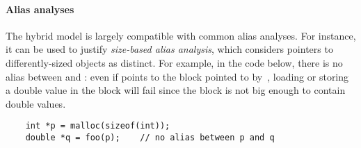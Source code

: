 


\paragraph{Alias analyses} The hybrid model is largely
compatible with common alias analyses.  For instance, it can be used
to justify \textit{size-based alias analysis}, which considers
pointers to differently-sized objects as distinct. For example, in
the code below, there is no alias between  and :
even if  points to the block
pointed to by~, loading or storing a double value in the
block will fail since the block is not big enough to contain double
values.
\begin{center}
  \begin{verbatim}
    int *p = malloc(sizeof(int));
    double *q = foo(p);    // no alias between p and q
  \end{verbatim}
\end{center}

